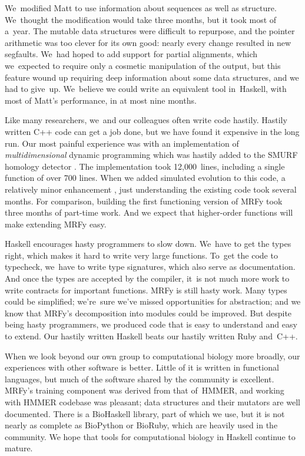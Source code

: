 \documentclass[preprint,nonatbib,blockstyle,nocopyrightspace,times]{sigplanconf}
\let\cite\citep
\begin{document}
We~modified Matt to use information about sequences as well as structure.
We~thought the modification would take three months, 
but it took most of a~year.
The mutable data structures were difficult to 
repurpose, and the pointer arithmetic was too clever for its own good: 
nearly every change resulted in new segfaults.
We~had hoped to add support for partial alignments,
which we~expected to require only 
a cosmetic manipulation of the 
output, but
this feature wound up
 requiring deep information about some data structures,
and we had to give~up.
We~believe we could write an equivalent tool in~Haskell,
with most of Matt's performance, in at most nine months.

Like many researchers, we~and our colleagues often write code hastily.
Hastily written C++ code can get a job done, 
but we have found it expensive in the long run.
Our most painful experience was with an implementation of
\textit{multidimensional}
dynamic programming which was hastily added to the SMURF homology detector
\cite{Menke:2010ti}.
The implementation took 12,000~lines, including a single function of
over 700 lines.
When we added simulated evolution to this code, a relatively minor
enhancement \cite{Daniels:2012}, 
just understanding the existing code took several months.
For comparison, 
building the first functioning version of MRFy took three months of part-time work.
And we expect that higher-order functions will make extending MRFy
easy.


Haskell encourages hasty programmers to slow down.
We~have to get the types right,
which makes it hard to write very large functions.
To~get the code to typecheck, we~have to write type signatures, which
also serve as documentation.
And once the types are accepted by the compiler,
it~is not much more work to write contracts for important functions.
MRFy is still hasty work.
Many types could be simplified;
we're~sure we've missed opportunities for abstraction;
and we know that MRFy's decomposition into modules could be improved.
But despite being hasty programmers, we produced code 
that is easy to understand and easy to extend.
Our hastily written Haskell beats
our hastily written Ruby and~C++.



When we look beyond our own group to computational biology more
broadly, our experiences with other software is better.
Little of it is written in functional languages, 
but much of the software shared by the community is excellent.
MRFy's training component was derived from that of~HMMER,
and
working with HMMER 
codebase was pleasant;
data structures and their
mutators are well documented. 
There is a 
BioHaskell library, part of which we use,
but it is not nearly as 
complete as BioPython or BioRuby, which are heavily used in the community.
We hope that tools for computational biology in
Haskell continue to mature. 
\end{document}
